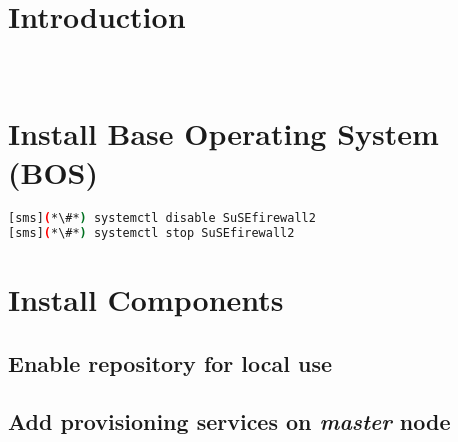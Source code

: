 \documentclass[letterpaper]{article}
\begin{document}
\graphicspath{{common/figures/}}
\thispagestyle{empty}


 

\newpage
\tableofcontents
\newpage


\section{Introduction} \label{sec:introduction}

 \\







\section{Install Base Operating System (BOS)}


\begin{lstlisting}[language=bash,keywords={}]
[sms](*\#*) systemctl disable SuSEfirewall2
[sms](*\#*) systemctl stop SuSEfirewall2
\end{lstlisting}


\section{Install \OHPC{} Components} \label{sec:basic_install}


\subsection{Enable \OHPC{} repository for local use} \label{sec:enable_repo}




\subsection{Add provisioning services on {\em master} node} \label{sec:add_provisioning}



\end{document}
